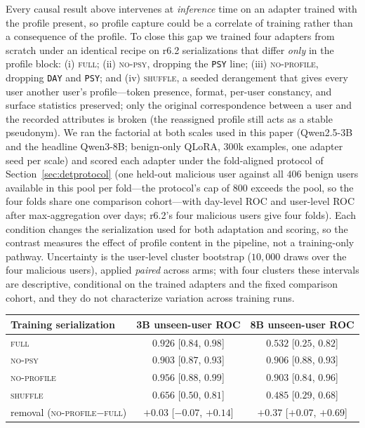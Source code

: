 \documentclass[10pt]{article} %
\newcommand{\rsix}{r6.2}
\begin{document}
Every causal result above intervenes at \emph{inference} time on an adapter
trained with the profile present, so profile capture could be a correlate of
training rather than a consequence of the profile. To close this gap we trained
four adapters from scratch under an identical recipe on \rsix{} serializations
that differ \emph{only} in the profile block: (i) \textsc{full}; (ii)
\textsc{no-psy}, dropping the \texttt{PSY} line; (iii) \textsc{no-profile},
dropping \texttt{DAY} and \texttt{PSY}; and (iv) \textsc{shuffle}, a seeded
derangement that gives every user another user's profile---token presence,
format, per-user constancy, and surface statistics preserved; only the
original correspondence between a user and the recorded attributes is broken
(the reassigned profile still acts as a stable pseudonym). We
ran the factorial at both scales used in this paper (Qwen2.5-3B and the
headline Qwen3-8B; benign-only QLoRA, $300$k examples, one adapter seed per
scale) and scored each adapter under the fold-aligned protocol of
Section~\ref{sec:detprotocol} (one held-out malicious user against all $406$ benign users available in
this pool per fold---the protocol's cap of $800$ exceeds the pool, so the four
folds share one comparison cohort---with day-level ROC and user-level ROC after
max-aggregation over days; \rsix{}'s four malicious users give four folds).
Each condition changes the serialization used for both adaptation and
scoring, so the contrast measures the effect of profile content in the
pipeline, not a training-only pathway. Uncertainty is the user-level cluster bootstrap ($10{,}000$ draws over the
four malicious users), applied \emph{paired} across arms; with four clusters
these intervals are descriptive, conditional on the trained adapters and the
fixed comparison cohort, and they do not characterize variation across
training runs.

\begin{center}
\begin{tabular}{lcc}
\toprule
Training serialization & 3B unseen-user ROC & 8B unseen-user ROC \\
\midrule
\textsc{full}       & $0.926$ [$0.84$, $0.98$] & $0.532$ [$0.25$, $0.82$] \\
\textsc{no-psy}     & $0.903$ [$0.87$, $0.93$] & $\mathbf{0.906}$ [$0.88$, $0.93$] \\
\textsc{no-profile} & $0.956$ [$0.88$, $0.99$] & $\mathbf{0.903}$ [$0.84$, $0.96$] \\
\textsc{shuffle}    & $0.656$ [$0.50$, $0.81$] & $0.485$ [$0.29$, $0.68$] \\
\midrule
removal (\textsc{no-profile}$-$\textsc{full}) & $+0.03$ [$-0.07$, $+0.14$] & $\mathbf{+0.37}$ [$+0.07$, $+0.69$] \\
\bottomrule
\end{tabular}
\end{center}
\end{document}
